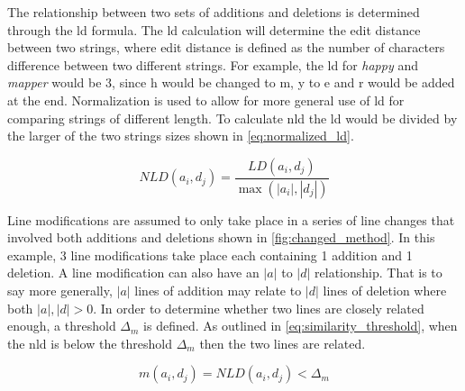 

% 


The relationship between two sets of additions and deletions is determined through the \gls{ld} formula. The \gls{ld} calculation will determine the edit distance between two strings, where edit distance is defined as the number of characters difference between two different strings. For example, the \gls{ld} for \textit{happy} and \textit{mapper} would be 3, since h would be changed to m, y to e and r would be added at the end. Normalization is used to allow for more general use of \gls{ld} for comparing strings of different length. To calculate \gls{nld} the \gls{ld} would be divided by the larger of the two strings sizes shown in \autoref{eq:normalized_ld}.


\begin{equation}
\label{eq:normalized_ld}
NLD(a_i, d_j) = \frac{LD(a_i, d_j)}{\max(|a_i|,|d_j|)}
\end{equation}

Line modifications are assumed to only take place in a series of line changes that involved both additions and deletions shown in \autoref{fig:changed_method}. In this example, 3 line modifications take place each containing 1 addition and 1 deletion. A line modification can also have an $|a|$ to $|d|$ relationship. That is to say more generally, $|a|$ lines of addition may relate to $|d|$ lines of deletion where both $|a|, |d| > 0$. In order to determine whether two lines are closely related enough, a threshold $\Delta_m$ is defined. As outlined in \autoref{eq:similarity_threshold}, when the \gls{nld} is below the threshold $\Delta_m$ then the two lines are related.

\begin{equation}
\label{eq:similarity_threshold}
m(a_i, d_j) = NLD(a_i, d_j) < \Delta_m
\end{equation}


